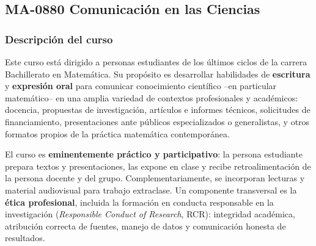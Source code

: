 \newpage
\subsection*{MA-0880 Comunicación en las Ciencias}

\hypertarget{MA0880}{}
\begin{refsection}
\begin{table}[H]
\end{table}

\subsubsection*{Descripción del curso}

Este curso está dirigido a personas estudiantes de los últimos ciclos de la carrera Bachillerato en Matemática. Su propósito es desarrollar habilidades de \textbf{escritura} y \textbf{expresión oral} para comunicar conocimiento científico --en particular matemático-- en una amplia variedad de contextos profesionales y académicos: docencia, propuestas de investigación, artículos e informes técnicos, solicitudes de financiamiento, presentaciones ante públicos especializados o generalistas, y otros formatos propios de la práctica matemática contemporánea.

El curso es \textbf{eminentemente práctico y participativo}: la persona estudiante prepara textos y presentaciones, las expone en clase y recibe retroalimentación de la persona docente y del grupo. Complementariamente, se incorporan lecturas y material audiovisual para trabajo extraclase. Un componente transversal es la \textbf{ética profesional}, incluida la formación en conducta responsable en la investigación (\emph{Responsible Conduct of Research}, RCR): integridad académica, atribución correcta de fuentes, manejo de datos y comunicación honesta de resultados.


\end{refsection}
